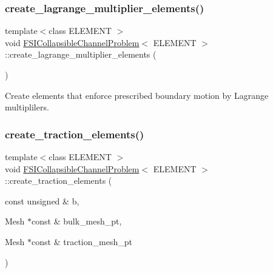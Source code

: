 \subsubsection{\texorpdfstring{create\+\_\+lagrange\+\_\+multiplier\+\_\+elements()}{create\_lagrange\_multiplier\_elements()}\hspace{0.1cm}{\footnotesize\ttfamily [2/2]}}
{\footnotesize\ttfamily template$<$class E\+L\+E\+M\+E\+NT $>$ \\
void \hyperlink{classFSICollapsibleChannelProblem}{F\+S\+I\+Collapsible\+Channel\+Problem}$<$ E\+L\+E\+M\+E\+NT $>$\+::create\+\_\+lagrange\+\_\+multiplier\+\_\+elements (\begin{DoxyParamCaption}{ }\end{DoxyParamCaption})\hspace{0.3cm}{\ttfamily [private]}}



Create elements that enforce prescribed boundary motion by Lagrange multiplilers. 

\mbox{\label{classFSICollapsibleChannelProblem_af7352e5fd5ea8965adbc9505749442a3}} 
\subsubsection{\texorpdfstring{create\+\_\+traction\+\_\+elements()}{create\_traction\_elements()}\hspace{0.1cm}{\footnotesize\ttfamily [1/4]}}
{\footnotesize\ttfamily template$<$class E\+L\+E\+M\+E\+NT $>$ \\
void \hyperlink{classFSICollapsibleChannelProblem}{F\+S\+I\+Collapsible\+Channel\+Problem}$<$ E\+L\+E\+M\+E\+NT $>$\+::create\+\_\+traction\+\_\+elements (\begin{DoxyParamCaption}\item[{const unsigned \&}]{b,  }\item[{Mesh $\ast$const \&}]{bulk\+\_\+mesh\+\_\+pt,  }\item[{Mesh $\ast$const \&}]{traction\+\_\+mesh\+\_\+pt }\end{DoxyParamCaption})\hspace{0.3cm}{\ttfamily [private]}}



